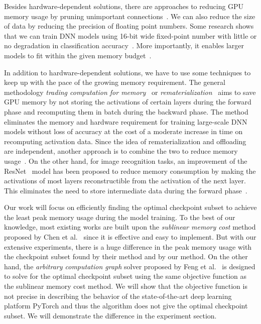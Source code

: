 Besides hardware-dependent solutions, there are approaches to reducing GPU memory usage by pruning unimportant connections~\cite{Han2015DeepCC, Han2015LearningBW}. We can also reduce the size of data by reducing the precision of floating point numbers. Some research shows that we can train DNN models using 16-bit wide fixed-point number with little or no degradation in classification accuracy~\cite{Gupta2015DeepLW}. More importantly, it enables larger models to fit within the given memory budget~\cite{10.1145/2925426.2926294}.


In addition to hardware-dependent solutions, we have to use some techniques to keep up with the pace of the growing memory requirement.
The general methodology {\em trading computation for memory}~\cite{chen2016training} or {\em rematerialization}~\cite{Gruslys2016MemoryEfficientBT, kirisame2021dynamic, herrmann2019optimal} aims to save GPU memory by not storing the activations of certain layers during the forward phase
and recomputing them in batch during the backward phase.
The method eliminates the memory and hardware requirement for training large-scale DNN models without loss of accuracy at the cost of a moderate increase in time on recomputing activation data.
Since the idea of rematerialization and offloading are independent, another approach is to combine the two to reduce memory usage~\cite{Beaumont2021EfficientCO}.
On the other hand, for image recognition tasks, an improvement of the ResNet~\cite{He2015DeepRL} model has been proposed to reduce memory consumption by making the activations of most layers reconstructible from the activation of the next layer. This eliminates the need to store intermediate data during the forward phase~\cite{Gomez2017TheRR}.

Our work will focus on efficiently finding the optimal checkpoint subset to achieve the least peak memory usage during the model training. To the best of our knowledge, most existing works are built upon the {\em sublinear memory cost} method proposed by Chen et al.~\cite{chen2016training} since it is effective and easy to implement.
But with our extensive experiments, there is a huge difference in the peak memory usage with the checkpoint subset found by their method and by our method.
On the other hand, the {\em arbitrary computation graph} solver proposed by Feng et al.~\cite{feng2021optimal}  is designed to solve for the optimal checkpoint subset using the same objective function as the sublinear memory cost method. We will show that the objective function is not precise in describing the behavior of the state-of-the-art deep learning platform PyTorch and thus the algorithm does not give the optimal checkpoint subset. We will demonstrate the difference in the experiment section.

